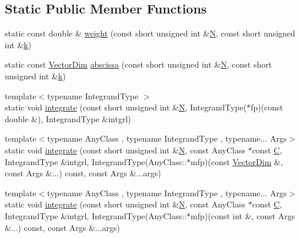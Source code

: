 \subsection*{Static Public Member Functions}
\begin{DoxyCompactItemize}
\item 
static const double \& \hyperlink{structmodel_1_1_quadrature_dynamic_3_01dim_00_011_00_01_quadrature_rule_01_4_aafaea0c9c43a45fc961e60843371b50f}{weight} (const short unsigned int \&\hyperlink{thompson__tetrahedron_8m_a7823765a845eb81829f110d8337f81ae}{N}, const short unsigned int \&\hyperlink{_f_e_m_2linear__elasticity__3d_2tetgen_2generate_p_o_l_ycube_8m_a5d2aad4440da75aa43f2643e72b1a3bd}{k})
\item 
static const \hyperlink{structmodel_1_1_quadrature_dynamic_3_01dim_00_011_00_01_quadrature_rule_01_4_a3efc5051d8d4eeceef8619ddd379ec2f}{Vector\+Dim} \hyperlink{structmodel_1_1_quadrature_dynamic_3_01dim_00_011_00_01_quadrature_rule_01_4_a586b6e354ac6ecf431ffe4277a0a628a}{abscissa} (const short unsigned int \&\hyperlink{thompson__tetrahedron_8m_a7823765a845eb81829f110d8337f81ae}{N}, const short unsigned int \&\hyperlink{_f_e_m_2linear__elasticity__3d_2tetgen_2generate_p_o_l_ycube_8m_a5d2aad4440da75aa43f2643e72b1a3bd}{k})
\item 
{\footnotesize template$<$typename Integrand\+Type $>$ }\\static void \hyperlink{structmodel_1_1_quadrature_dynamic_3_01dim_00_011_00_01_quadrature_rule_01_4_af3a82faa20c19ec844126e97029eeee2}{integrate} (const short unsigned int \&\hyperlink{thompson__tetrahedron_8m_a7823765a845eb81829f110d8337f81ae}{N}, Integrand\+Type($\ast$fp)(const double \&), Integrand\+Type \&intgrl)
\item 
{\footnotesize template$<$typename Any\+Class , typename Integrand\+Type , typename... Args$>$ }\\static void \hyperlink{structmodel_1_1_quadrature_dynamic_3_01dim_00_011_00_01_quadrature_rule_01_4_afbe0b107e4417975ab78a43141ca66b8}{integrate} (const short unsigned int \&\hyperlink{thompson__tetrahedron_8m_a7823765a845eb81829f110d8337f81ae}{N}, const Any\+Class $\ast$const \hyperlink{plot_cells_8m_aaa53ca0b650dfd85c4f59fa156f7a2cc}{C}, Integrand\+Type \&intgrl, Integrand\+Type(Any\+Class\+::$\ast$mfp)(const \hyperlink{structmodel_1_1_quadrature_dynamic_3_01dim_00_011_00_01_quadrature_rule_01_4_a3efc5051d8d4eeceef8619ddd379ec2f}{Vector\+Dim} \&, const Args \&...) const, const Args \&...args)
\item 
{\footnotesize template$<$typename Any\+Class , typename Integrand\+Type , typename... Args$>$ }\\static void \hyperlink{structmodel_1_1_quadrature_dynamic_3_01dim_00_011_00_01_quadrature_rule_01_4_a30712afdce2537931f596a027faa8e95}{integrate} (const short unsigned int \&\hyperlink{thompson__tetrahedron_8m_a7823765a845eb81829f110d8337f81ae}{N}, const Any\+Class $\ast$const \hyperlink{plot_cells_8m_aaa53ca0b650dfd85c4f59fa156f7a2cc}{C}, Integrand\+Type \&intgrl, Integrand\+Type(Any\+Class\+::$\ast$mfp)(const int \&, const Args \&...) const, const Args \&...args)

\end{DoxyCompactItemize}
